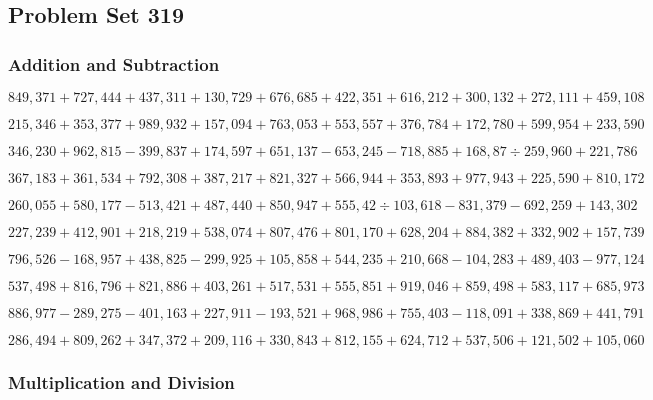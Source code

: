 \hypertarget{problem-set-319}{%
\subsection{Problem Set 319}\label{problem-set-319}}

\hypertarget{addition-and-subtraction}{%
\subsubsection{Addition and
Subtraction}\label{addition-and-subtraction}}

\(849,371+727,444+437,311+130,729+676,685+422,351+616,212+300,132+272,111+459,108\)

\(215,346+353,377+989,932+157,094+763,053+553,557+376,784+172,780+599,954+233,590\)

\(346,230+962,815-399,837+174,597+651,137-653,245-718,885+168,87÷259,960+221,786\)

\(367,183+361,534+792,308+387,217+821,327+566,944+353,893+977,943+225,590+810,172\)

\(260,055+580,177-513,421+487,440+850,947+555,42÷103,618-831,379-692,259+143,302\)

\(227,239+412,901+218,219+538,074+807,476+801,170+628,204+884,382+332,902+157,739\)

\(796,526-168,957+438,825-299,925+105,858+544,235+210,668-104,283+489,403-977,124\)

\(537,498+816,796+821,886+403,261+517,531+555,851+919,046+859,498+583,117+685,973\)

\(886,977-289,275-401,163+227,911-193,521+968,986+755,403-118,091+338,869+441,791\)

\(286,494+809,262+347,372+209,116+330,843+812,155+624,712+537,506+121,502+105,060\)

\hypertarget{multiplication-and-division}{%
\subsubsection{Multiplication and
Division}\label{multiplication-and-division}}

